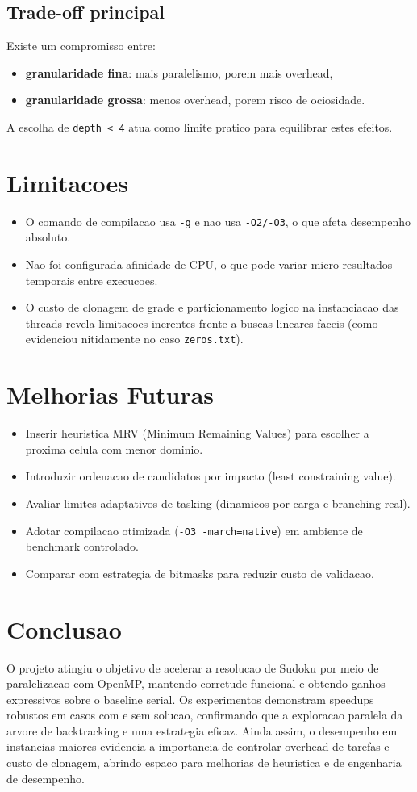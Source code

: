 \documentclass[11pt,a4paper]{article}
\begin{document}
\subsection{Trade-off principal}
Existe um compromisso entre:
\begin{itemize}
  \item \textbf{granularidade fina}: mais paralelismo, porem mais overhead,
  \item \textbf{granularidade grossa}: menos overhead, porem risco de ociosidade.
\end{itemize}
A escolha de \texttt{depth < 4} atua como limite pratico para equilibrar estes efeitos.

\section{Limitacoes}
\begin{itemize}
  \item O comando de compilacao usa \texttt{-g} e nao usa \texttt{-O2/-O3}, o que afeta desempenho absoluto.
  \item Nao foi configurada afinidade de CPU, o que pode variar micro-resultados temporais entre execucoes.
  \item O custo de clonagem de grade e particionamento logico na instanciacao das threads revela limitacoes inerentes frente a buscas lineares faceis (como evidenciou nitidamente no caso \texttt{zeros.txt}).
\end{itemize}

\section{Melhorias Futuras}
\begin{itemize}
  \item Inserir heuristica MRV (Minimum Remaining Values) para escolher a proxima celula com menor dominio.
  \item Introduzir ordenacao de candidatos por impacto (least constraining value).
  \item Avaliar limites adaptativos de tasking (dinamicos por carga e branching real).
  \item Adotar compilacao otimizada (\texttt{-O3 -march=native}) em ambiente de benchmark controlado.
  \item Comparar com estrategia de bitmasks para reduzir custo de validacao.
\end{itemize}

\section{Conclusao}
O projeto atingiu o objetivo de acelerar a resolucao de Sudoku por meio de paralelizacao com OpenMP, mantendo corretude funcional e obtendo ganhos expressivos sobre o baseline serial. Os experimentos demonstram speedups robustos em casos com e sem solucao, confirmando que a exploracao paralela da arvore de backtracking e uma estrategia eficaz. Ainda assim, o desempenho em instancias maiores evidencia a importancia de controlar overhead de tarefas e custo de clonagem, abrindo espaco para melhorias de heuristica e de engenharia de desempenho.
\end{document}
